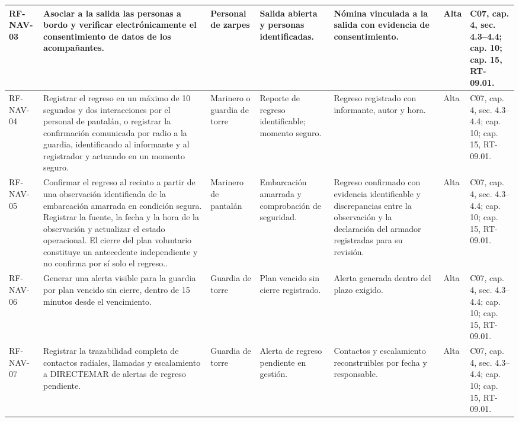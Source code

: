 \begin{longtable}{|L{0.080645\AnchoTablaAnexo}|L{0.262097\AnchoTablaAnexo}|L{0.100806\AnchoTablaAnexo}|L{0.145161\AnchoTablaAnexo}|L{0.173387\AnchoTablaAnexo}|L{0.060484\AnchoTablaAnexo}|L{0.177420\AnchoTablaAnexo}|}
RF-\allowbreak{}NAV-\allowbreak{}03 &
Asociar a la salida las personas a bordo y verificar electrónicamente el consentimiento de datos de los acompañantes. &
Personal de zarpes &
Salida abierta y personas identificadas. &
Nómina vinculada a la salida con evidencia de consentimiento. &
Alta &
C07, cap. 4, sec. 4.3–4.4; cap. 10; cap. 15, RT-09.01. \\ \hline

RF-\allowbreak{}NAV-\allowbreak{}04 &
Registrar el regreso en un máximo de 10 segundos y dos interacciones por el personal de pantalán, o registrar la confirmación comunicada por radio a la guardia, identificando al informante y al registrador y actuando en un momento seguro. &
Marinero o guardia de torre &
Reporte de regreso identificable; momento seguro. &
Regreso registrado con informante, autor y hora. &
Alta &
C07, cap. 4, sec. 4.3–4.4; cap. 10; cap. 15, RT-09.01. \\ \hline

RF-\allowbreak{}NAV-\allowbreak{}05 &
Confirmar el regreso al recinto a partir de una observación identificada
de la embarcación amarrada en condición segura. Registrar la fuente,
la fecha y la hora de la observación y actualizar el estado operacional.
El cierre del plan voluntario constituye un antecedente independiente
y no confirma por sí solo el regreso.. &
Marinero de pantalán &
Embarcación amarrada y comprobación de seguridad. &
Regreso confirmado con evidencia identificable y discrepancias entre
la observación y la declaración del armador registradas para su revisión. &
Alta &
C07, cap. 4, sec. 4.3–4.4; cap. 10; cap. 15, RT-09.01. \\ \hline

RF-\allowbreak{}NAV-\allowbreak{}06 &
Generar una alerta visible para la guardia por plan vencido sin cierre, dentro de 15 minutos desde el vencimiento. &
Guardia de torre &
Plan vencido sin cierre registrado. &
Alerta generada dentro del plazo exigido. &
Alta &
C07, cap. 4, sec. 4.3–4.4; cap. 10; cap. 15, RT-09.01. \\ \hline

RF-\allowbreak{}NAV-\allowbreak{}07 &
Registrar la trazabilidad completa de contactos radiales, llamadas y escalamiento a DIRECTEMAR de alertas de regreso pendiente. &
Guardia de torre &
Alerta de regreso pendiente en gestión. &
Contactos y escalamiento reconstruibles por fecha y responsable. &
Alta &
C07, cap. 4, sec. 4.3–4.4; cap. 10; cap. 15, RT-09.01. \\ \hline


\end{longtable}

